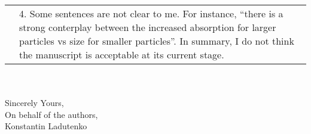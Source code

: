 \documentclass[a4paper]{article}
\begin{document}
\begin{tabular}[!H]{l|p{}}
\quad & 4.      Some sentences are not clear to me. For instance,
“there is a strong conterplay between the increased absorption for
larger particles vs size for smaller particles”. 
In summary, I do not think the manuscript is acceptable at its current
stage. 
\end{tabular}
\\
\vspace{10pt}
\\
Sincerely Yours,\\
On behalf of the authors,\\
Konstantin Ladutenko
\end{document}
